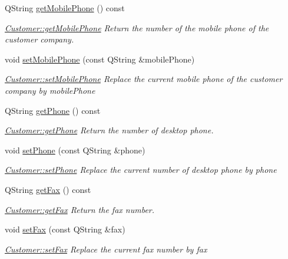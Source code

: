 \begin{DoxyCompactItemize}
Q\+String \hyperlink{classModels_1_1Customer_a97211324b1f890b5f7a3fffc447289d7}{get\+Mobile\+Phone} () const 
\begin{DoxyCompactList}\small\item\em \hyperlink{classModels_1_1Customer_a97211324b1f890b5f7a3fffc447289d7}{Customer\+::get\+Mobile\+Phone} Return the number of the mobile phone of the customer company. \end{DoxyCompactList}\item 
void \hyperlink{classModels_1_1Customer_abefe9de1e3c46501916e461ba6609450}{set\+Mobile\+Phone} (const Q\+String \&mobile\+Phone)
\begin{DoxyCompactList}\small\item\em \hyperlink{classModels_1_1Customer_abefe9de1e3c46501916e461ba6609450}{Customer\+::set\+Mobile\+Phone} Replace the current mobile phone of the customer company by {\itshape mobile\+Phone} \end{DoxyCompactList}\item 
Q\+String \hyperlink{classModels_1_1Customer_a0438cd11dfe13bb89c0233ffe288cc73}{get\+Phone} () const 
\begin{DoxyCompactList}\small\item\em \hyperlink{classModels_1_1Customer_a0438cd11dfe13bb89c0233ffe288cc73}{Customer\+::get\+Phone} Return the number of desktop phone. \end{DoxyCompactList}\item 
void \hyperlink{classModels_1_1Customer_abbc25028b09ae36da632cefbfbbbcce6}{set\+Phone} (const Q\+String \&phone)
\begin{DoxyCompactList}\small\item\em \hyperlink{classModels_1_1Customer_abbc25028b09ae36da632cefbfbbbcce6}{Customer\+::set\+Phone} Replace the current number of desktop phone by {\itshape phone} \end{DoxyCompactList}\item 
Q\+String \hyperlink{classModels_1_1Customer_a08ce4fbbd62f3e3f407faea2bf351f69}{get\+Fax} () const 
\begin{DoxyCompactList}\small\item\em \hyperlink{classModels_1_1Customer_a08ce4fbbd62f3e3f407faea2bf351f69}{Customer\+::get\+Fax} Return the fax number. \end{DoxyCompactList}\item 
void \hyperlink{classModels_1_1Customer_a4a6ba86c58db9bca2737bbeb723a0db3}{set\+Fax} (const Q\+String \&fax)
\begin{DoxyCompactList}\small\item\em \hyperlink{classModels_1_1Customer_a4a6ba86c58db9bca2737bbeb723a0db3}{Customer\+::set\+Fax} Replace the current fax number by {\itshape fax} \end{DoxyCompactList}\item 

\end{DoxyCompactItemize}

